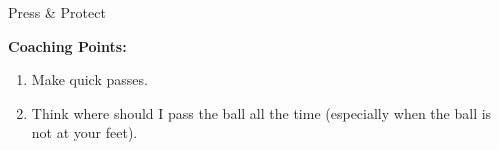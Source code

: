 \begin{evenBlock}{Press \& Protect}
\begin{minipage}[t]{\linewidth}
\begin{minipage}{.5\linewidth}
        \textbf{Coaching Points:}
        \begin{enumerate}
        \setlength{\itemsep}{0pt}
        \setlength{\parskip}{0pt}
        \setlength{\parsep}{0pt}
        \item Make quick passes.
        \item Think where should I pass the ball all the time (especially when the ball is not at your feet).
        \end{enumerate}
    \end{minipage}
\end{minipage}

\end{evenBlock}